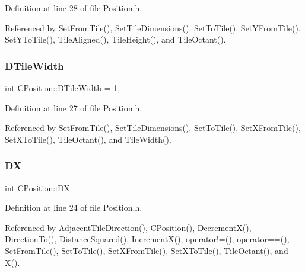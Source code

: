 Definition at line 28 of file Position.\+h.



Referenced by Set\+From\+Tile(), Set\+Tile\+Dimensions(), Set\+To\+Tile(), Set\+Y\+From\+Tile(), Set\+Y\+To\+Tile(), Tile\+Aligned(), Tile\+Height(), and Tile\+Octant().

\hypertarget{classCPosition_ac17d12fb5d35fcf62d63bb42e8cf7ed6}{}\label{classCPosition_ac17d12fb5d35fcf62d63bb42e8cf7ed6} 
\subsubsection{\texorpdfstring{D\+Tile\+Width}{DTileWidth}}
{\footnotesize\ttfamily int C\+Position\+::\+D\+Tile\+Width = 1\hspace{0.3cm}{\ttfamily [static]}, {\ttfamily [protected]}}



Definition at line 27 of file Position.\+h.



Referenced by Set\+From\+Tile(), Set\+Tile\+Dimensions(), Set\+To\+Tile(), Set\+X\+From\+Tile(), Set\+X\+To\+Tile(), Tile\+Octant(), and Tile\+Width().

\hypertarget{classCPosition_a28445f9b872169715919074d82044eda}{}\label{classCPosition_a28445f9b872169715919074d82044eda} 
\subsubsection{\texorpdfstring{DX}{DX}}
{\footnotesize\ttfamily int C\+Position\+::\+DX\hspace{0.3cm}{\ttfamily [protected]}}



Definition at line 24 of file Position.\+h.



Referenced by Adjacent\+Tile\+Direction(), C\+Position(), Decrement\+X(), Direction\+To(), Distance\+Squared(), Increment\+X(), operator!=(), operator==(), Set\+From\+Tile(), Set\+To\+Tile(), Set\+X\+From\+Tile(), Set\+X\+To\+Tile(), Tile\+Octant(), and X().

\hypertarget{classCPosition_a84139c9e8eb547e7cf3cb851739943a4}{}\label{classCPosition_a84139c9e8eb547e7cf3cb851739943a4} 
